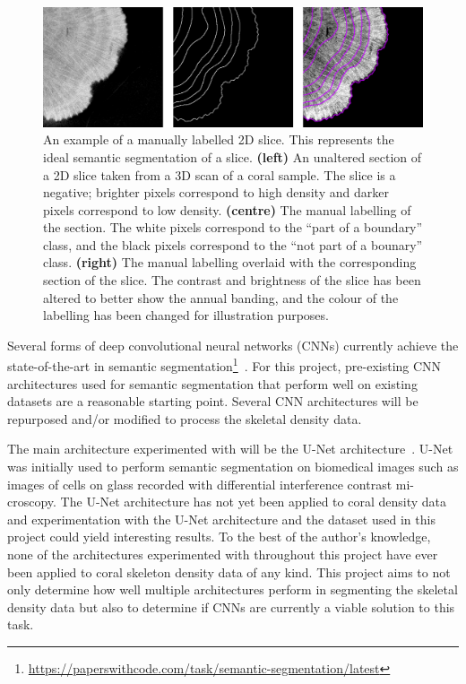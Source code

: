 \begin{figure}[t]
    \centering
    \includegraphics[width=1\textwidth]{images/label-example.png}
    \caption{An example of a manually labelled 2D slice. This represents the ideal semantic segmentation of a slice. \textbf{(left)} An unaltered section of a 2D slice taken from a 3D scan of a coral sample. The slice is a negative; brighter pixels correspond to high density and darker pixels correspond to low density. \textbf{(centre)} The manual labelling of the section. The white pixels correspond to the ``part of a boundary'' class, and the black pixels correspond to the ``not part of a bounary'' class. \textbf{(right)} The manual labelling overlaid with the corresponding section of the slice. The contrast and brightness of the slice has been altered to better show the annual banding, and the colour of the labelling has been changed for illustration purposes.}
    \label{fig:example-label}
\end{figure}

Several forms of deep convolutional neural networks (CNNs) currently achieve the state-of-the-art in semantic segmentation\footnote{\url{https://paperswithcode.com/task/semantic-segmentation/latest}}~\cite{chen2018encoder, semanticseg-SOTA}. For this project, pre-existing CNN architectures used for semantic segmentation that perform well on existing datasets are a reasonable starting point. Several CNN architectures will be repurposed and/or modified to process the skeletal density data.

The main architecture experimented with will be the U-Net architecture~\cite{ronneberger2015u}. U-Net was initially used to perform semantic segmentation on biomedical images such as images of cells on glass recorded with differential interference contrast mi-croscopy. The U-Net architecture has not yet been applied to coral density data and experimentation with the U-Net architecture and the dataset used in this project could yield interesting results. To the best of the author's knowledge, none of the architectures experimented with throughout this project have ever been applied to coral skeleton density data of any kind. This project aims to not only determine how well multiple architectures perform in segmenting the skeletal density data but also to determine if CNNs are currently a viable solution to this task.

